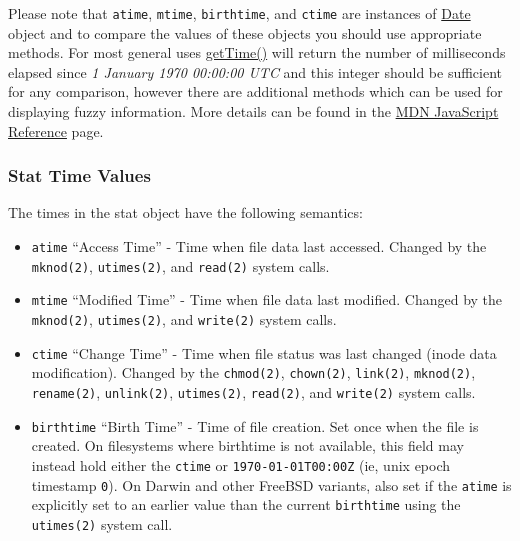 Please note that \texttt{atime}, \texttt{mtime}, \texttt{birthtime}, and
\texttt{ctime} are instances of
\href{https://developer.mozilla.org/en/JavaScript/Reference/Global_Objects/Date}{Date}
object and to compare the values of these objects you should use
appropriate methods. For most general uses
\href{https://developer.mozilla.org/en/JavaScript/Reference/Global_Objects/Date/getTime}{getTime()}
will return the number of milliseconds elapsed since \emph{1 January
1970 00:00:00 UTC} and this integer should be sufficient for any
comparison, however there are additional methods which can be used for
displaying fuzzy information. More details can be found in the
\href{https://developer.mozilla.org/en/JavaScript/Reference/Global_Objects/Date}{MDN
JavaScript Reference} page.

\subsubsection{Stat Time Values}\label{stat-time-values}

The times in the stat object have the following semantics:

\begin{itemize}
\itemsep1pt\parskip0pt
\item
  \texttt{atime} ``Access Time'' - Time when file data last accessed.
  Changed by the \texttt{mknod(2)}, \texttt{utimes(2)}, and
  \texttt{read(2)} system calls.
\item
  \texttt{mtime} ``Modified Time'' - Time when file data last modified.
  Changed by the \texttt{mknod(2)}, \texttt{utimes(2)}, and
  \texttt{write(2)} system calls.
\item
  \texttt{ctime} ``Change Time'' - Time when file status was last
  changed (inode data modification). Changed by the \texttt{chmod(2)},
  \texttt{chown(2)}, \texttt{link(2)}, \texttt{mknod(2)},
  \texttt{rename(2)}, \texttt{unlink(2)}, \texttt{utimes(2)},
  \texttt{read(2)}, and \texttt{write(2)} system calls.
\item
  \texttt{birthtime} ``Birth Time'' - Time of file creation. Set once
  when the file is created. On filesystems where birthtime is not
  available, this field may instead hold either the \texttt{ctime} or
  \texttt{1970-01-01T00:00Z} (ie, unix epoch timestamp \texttt{0}). On
  Darwin and other FreeBSD variants, also set if the \texttt{atime} is
  explicitly set to an earlier value than the current \texttt{birthtime}
  using the \texttt{utimes(2)} system call.
\end{itemize}

